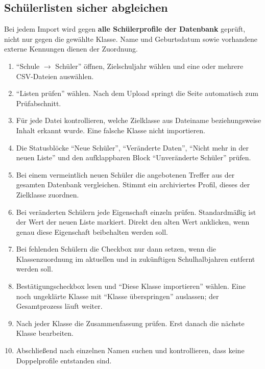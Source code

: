 \documentclass[12pt,a4paper]{article}
\begin{document}
\subsection*{Schülerlisten sicher abgleichen}
Bei jedem Import wird gegen \textbf{alle Schülerprofile der Datenbank} geprüft, nicht nur gegen die gewählte Klasse. Name und Geburtsdatum sowie vorhandene externe Kennungen dienen der Zuordnung.

\begin{enumerate}
  \item \enquote{Schule \(\rightarrow\) Schüler} öffnen, Zielschuljahr wählen und eine oder mehrere CSV-Dateien auswählen.
  \item \enquote{Listen prüfen} wählen. Nach dem Upload springt die Seite automatisch zum Prüfabschnitt.
  \item Für jede Datei kontrollieren, welche Zielklasse aus Dateiname beziehungsweise Inhalt erkannt wurde. Eine falsche Klasse nicht importieren.
  \item Die Statusblöcke \enquote{Neue Schüler}, \enquote{Veränderte Daten}, \enquote{Nicht mehr in der neuen Liste} und den aufklappbaren Block \enquote{Unveränderte Schüler} prüfen.
  \item Bei einem vermeintlich neuen Schüler die angebotenen Treffer aus der gesamten Datenbank vergleichen. Stimmt ein archiviertes Profil, dieses der Zielklasse zuordnen.
  \item Bei veränderten Schülern jede Eigenschaft einzeln prüfen. Standardmäßig ist der Wert der neuen Liste markiert. Direkt den alten Wert anklicken, wenn genau diese Eigenschaft beibehalten werden soll.
  \item Bei fehlenden Schülern die Checkbox nur dann setzen, wenn die Klassenzuordnung im aktuellen und in zukünftigen Schulhalbjahren entfernt werden soll.
  \item Bestätigungscheckbox lesen und \enquote{Diese Klasse importieren} wählen. Eine noch ungeklärte Klasse mit \enquote{Klasse überspringen} auslassen; der Gesamtprozess läuft weiter.
  \item Nach jeder Klasse die Zusammenfassung prüfen. Erst danach die nächste Klasse bearbeiten.
  \item Abschließend nach einzelnen Namen suchen und kontrollieren, dass keine Doppelprofile entstanden sind.
\end{enumerate}
\end{document}
